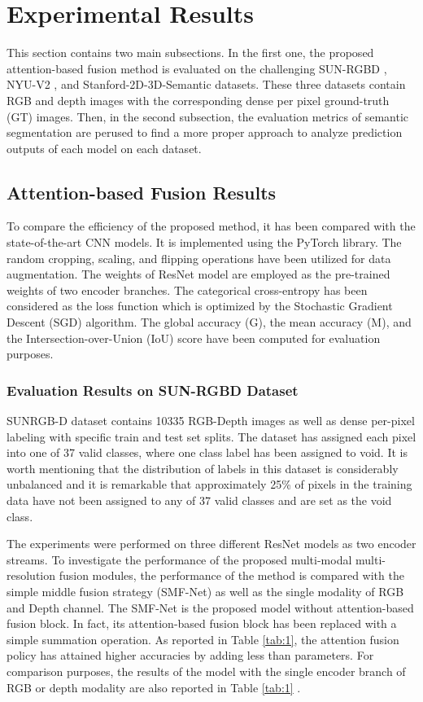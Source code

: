 \documentclass[journal,transmag]{IEEEtran}
\begin{document}
\section{Experimental Results}
\label{sec:4}
This section contains two main subsections. In the first one, the proposed attention-based fusion method is evaluated on the challenging  SUN-RGBD \cite{song2015sun}, NYU-V2 \cite{silberman2012indoor}, and Stanford-2D-3D-Semantic \cite{armeni2017joint} datasets. These three datasets contain RGB and depth images with the corresponding dense per pixel ground-truth (GT) images. Then, in the second subsection, the evaluation metrics of semantic segmentation are perused to find a more proper approach to analyze prediction outputs of each model on each dataset.

\subsection{Attention-based Fusion Results}
 To compare the efficiency of the proposed method, it has been compared with the state-of-the-art CNN models. It is implemented using the PyTorch library. The random cropping, scaling, and flipping operations have been utilized for data augmentation. The weights of ResNet model are employed as the pre-trained weights of two encoder branches. The categorical cross-entropy has been considered as the loss function which is optimized by the Stochastic Gradient Descent (SGD) algorithm. The global accuracy (G), the mean accuracy (M), and the Intersection-over-Union (IoU)  score have been computed for evaluation purposes. 

 
\subsubsection{Evaluation Results on SUN-RGBD Dataset} 
SUNRGB-D dataset contains 10335  RGB-Depth images as well as dense per-pixel labeling with specific train and test set splits. The dataset has assigned each pixel into one of 37 valid classes, where one class label has been assigned to void. It is worth mentioning that the distribution of labels in this dataset is considerably unbalanced and it is remarkable that approximately 25\% of pixels in the training data have not been assigned to any of 37 valid classes and are set as the void class. 

The experiments were performed on three different ResNet models as two encoder streams. To investigate the performance of the proposed multi-modal multi-resolution fusion modules, the performance of the method is compared with the simple middle fusion strategy (SMF-Net) as well as the single modality of RGB and Depth channel. The SMF-Net is the proposed model without attention-based fusion block. In fact, its attention-based fusion block has been replaced with a simple summation operation.  As reported in Table \ref{tab:1}, the attention fusion policy has attained higher accuracies by adding less than  parameters. For comparison purposes, the results of the model with the single encoder branch of RGB or depth modality are also reported in Table \ref{tab:1} . 
\end{document}
